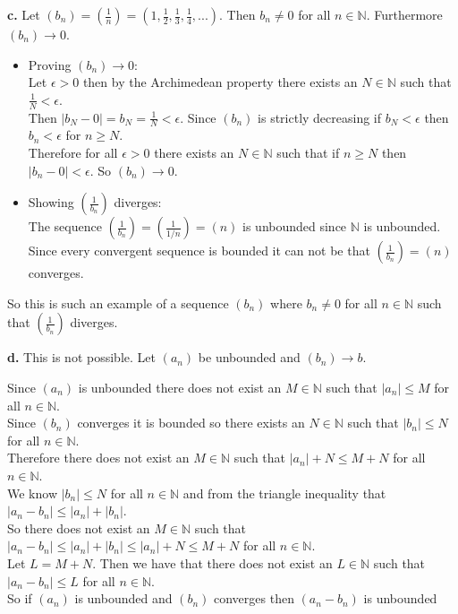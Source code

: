 \documentclass{article}
\begin{document}
{\Large \textbf{c.}} Let $(b_n) = (\frac{1}{n}) = (1,\frac{1}{2},\frac{1}{3},\frac{1}{4}, ...)$. Then $b_n\neq 0$ for all $n\in\mathbb{N}$. Furthermore $(b_n)\rightarrow 0$.
\begin{center}
    \doublespacing
    \begin{itemize}
        \item Proving $(b_n)\rightarrow 0$:
        \\Let $\epsilon > 0$ then by the Archimedean property there exists an $N\in\mathbb{N}$ such that $\frac{1}{N} <\epsilon$.
        \\Then $|b_N - 0| = b_N =\frac{1}{N} <\epsilon$. Since $(b_n)$ is strictly decreasing if $b_N <\epsilon$ then $b_n <\epsilon$ for $n\geq N$.
        \\Therefore for all $\epsilon > 0$ there exists an $N\in\mathbb{N}$ such that if $n\geq N$ then $|b_n - 0| <\epsilon$. So $(b_n)\rightarrow 0$.
        \item Showing $(\frac{1}{b_n})$ diverges:
        \\The sequence $(\frac{1}{b_n}) = (\frac{1}{1/n}) = (n)$ is unbounded since $\mathbb{N}$ is unbounded.
        \\Since every convergent sequence is bounded it can not be that $(\frac{1}{b_n}) = (n)$ converges.
    \end{itemize}
    So this is such an example of a sequence $(b_n)$ where $b_n\neq 0$ for all $n\in\mathbb{N}$ such that $(\frac{1}{b_n})$ diverges.
\end{center}

{\Large \textbf{d.}} This is not possible. Let $(a_n)$ be unbounded and $(b_n)\rightarrow b$.
\begin{center}
    \doublespacing
    Since $(a_n)$ is unbounded there does not exist an $M\in\mathbb{N}$ such that $|a_n|\leq M$ for all $n\in\mathbb{N}$.
    \\Since $(b_n)$ converges it is bounded so there exists an $N\in\mathbb{N}$ such that $|b_n|\leq N$ for all $n\in\mathbb{N}$.
    \\Therefore there does not exist an $M\in\mathbb{N}$ such that $|a_n| + N\leq M + N$ for all $n\in\mathbb{N}$.
    \\We know $|b_n|\leq N$ for all $n\in\mathbb{N}$ and from the triangle inequality that $|a_n - b_n|\leq |a_n| + |b_n|$.
    \\So there does not exist an $M\in\mathbb{N}$ such that $|a_n - b_n|\leq |a_n| + |b_n|\leq |a_n| + N\leq M + N$ for all $n\in\mathbb{N}$.
    \\Let $L = M + N$. Then we have that there does not exist an $L\in\mathbb{N}$ such that $|a_n - b_n|\leq L$ for all $n\in\mathbb{N}$.
    \\So if $(a_n)$ is unbounded and $(b_n)$ converges then $(a_n - b_n)$ is unbounded \qedsymbol
\end{center}
\end{document}
